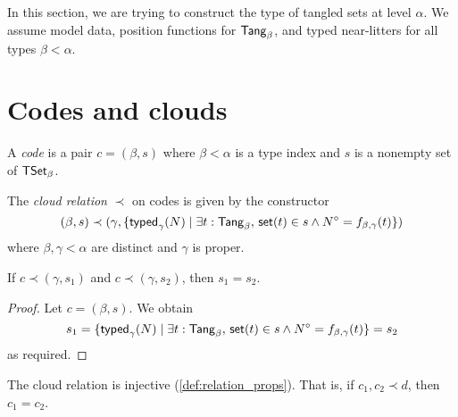 In this section, we are trying to construct the type of tangled sets at level \( \alpha \).
We assume model data, position functions for \( \mathsf{Tang}_\beta \), and typed near-litters for all types \( \beta < \alpha \).

\section{Codes and clouds}
\begin{definition}[code]
  \label{def:Code}
  A \emph{code} is a pair \( c = (\beta, s) \) where \( \beta < \alpha \) is a type index and \( s \) is a nonempty set of \( \mathsf{TSet}_\beta \).
\end{definition}
\begin{definition}[cloud]
  \label{def:cloud}
  The \emph{cloud relation} \( \prec \) on codes is given by the constructor
  \[ (\beta, s) \prec (\gamma, \{ \operatorname{\mathsf{typed}}_\gamma(N) \mid \exists t : \mathsf{Tang}_\beta,\, \operatorname{\mathsf{set}}(t) \in s \wedge N^\circ = f_{\beta,\gamma}(t) \}) \]
  where \( \beta, \gamma < \alpha \) are distinct and \( \gamma \) is proper.
\end{definition}
\begin{proposition}
  \label{prop:eq_of_cloud}
  If \( c \prec (\gamma, s_1) \) and \( c \prec (\gamma, s_2) \), then \( s_1 = s_2 \).
\end{proposition}
\begin{proof}
  Let \( c = (\beta, s) \).
  We obtain
  \[ s_1 = \{ \operatorname{\mathsf{typed}}_\gamma(N) \mid \exists t : \mathsf{Tang}_\beta,\, \operatorname{\mathsf{set}}(t) \in s \wedge N^\circ = f_{\beta,\gamma}(t) \} = s_2 \]
  as required.
\end{proof}
\begin{proposition}
  \label{prop:cloud_injective}
  The cloud relation is injective (\cref{def:relation_props}).
  That is, if \( c_1, c_2 \prec d \), then \( c_1 = c_2 \).
\end{proposition}
